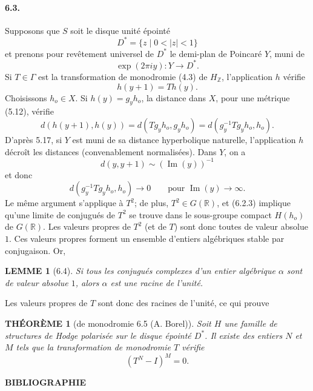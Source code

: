 \documentclass[10pt]{article}
\newcommand{\R}{\mathbb R}
\newcommand{\Z}{\mathbb Z}
\theoremstyle{deligne}
\newtheorem*{theoreme}{THÉORÈME}
\newtheorem*{lemme}{LEMME}
\begin{document}
\paragraph{6.3.}
Supposons que $S$ soit le disque unité épointé
\[
  D^*=\{z\mid 0<|z|<1\}
\]
et prenons pour revêtement universel de $D^*$ le demi-plan de Poincaré $Y$, muni de
\[
  \exp(2\pi i y):Y\longrightarrow D^*.
\]
Si $T\in\Gamma$ est la transformation de monodromie (4.3) de $H_\Z$, l'application $h$ vérifie
\[
\tag{6.3.1}
  h(y+1)=T h(y).
\]
Choisissons $h_o\in X$. Si $h(y)=g_yh_o$, la distance dans $X$, pour une métrique (5.12), vérifie
\[
\tag{6.3.2}
  d(h(y+1),h(y))=d(Tg_yh_o,g_yh_o)=d(g_y^{-1}Tg_yh_o,h_o).
\]
D'après 5.17, si $Y$ est muni de sa distance hyperbolique naturelle, l'application $h$ décroît les distances (convenablement normalisées). Dans $Y$, on a
\[
  d(y,y+1)\sim (\operatorname{Im}(y))^{-1}
\]
et donc
\[
\tag{6.3.3}
  d(g_y^{-1}Tg_yh_o,h_o)\longrightarrow 0\qquad\text{pour }\operatorname{Im}(y)\to\infty .
\]
Le même argument s'applique à $T^2$; de plus, $T^2\in G(\R)$, et (6.2.3) implique qu'une limite de conjugués de $T^2$ se trouve dans le sous-groupe compact $H(h_o)$ de $G(\R)$. Les valeurs propres de $T^2$ (et de $T$) sont donc toutes de valeur absolue $1$.
Ces valeurs propres forment un ensemble d'entiers algébriques stable par conjugaison. Or,

\begin{lemme}[6.4]
Si tous les conjugués complexes d'un entier algébrique $\alpha$ sont de valeur absolue $1$, alors $\alpha$ est une racine de l'unité.
\end{lemme}

Les valeurs propres de $T$ sont donc des racines de l'unité, ce qui prouve

\begin{theoreme}[de monodromie 6.5 (A. Borel)]
Soit $H$ une famille de structures de Hodge polarisée sur le disque épointé $D^*$. Il existe des entiers $N$ et $M$ tels que la transformation de monodromie $T$ vérifie
\[
  (T^N-I)^M=0.
\]
\end{theoreme}

\begin{center}
\bfseries BIBLIOGRAPHIE
\end{center}
\end{document}
